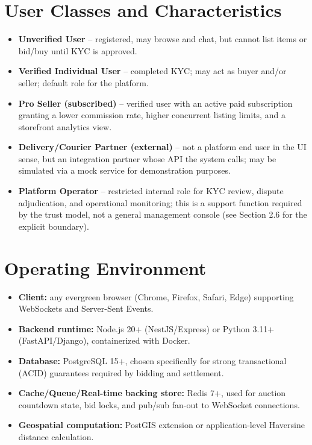 \documentclass[11pt,a4paper]{report}
\begin{document}
\section{User Classes and Characteristics}
\begin{itemize}[nosep]
    \item \textbf{Unverified User} -- registered, may browse and chat, but cannot list items or bid/buy until KYC is approved.
    \item \textbf{Verified Individual User} -- completed KYC; may act as buyer and/or seller; default role for the platform.
    \item \textbf{Pro Seller (subscribed)} -- verified user with an active paid subscription granting a lower commission rate, higher concurrent listing limits, and a storefront analytics view.
    \item \textbf{Delivery/Courier Partner (external)} -- not a platform end user in the UI sense, but an integration partner whose API the system calls; may be simulated via a mock service for demonstration purposes.
    \item \textbf{Platform Operator} -- restricted internal role for KYC review, dispute adjudication, and operational monitoring; this is a support function required by the trust model, not a general management console (see Section 2.6 for the explicit boundary).
\end{itemize}

\section{Operating Environment}
\begin{itemize}[nosep]
    \item \textbf{Client:} any evergreen browser (Chrome, Firefox, Safari, Edge) supporting WebSockets and Server-Sent Events.
    \item \textbf{Backend runtime:} Node.js 20+ (NestJS/Express) or Python 3.11+ (FastAPI/Django), containerized with Docker.
    \item \textbf{Database:} PostgreSQL 15+, chosen specifically for strong transactional (ACID) guarantees required by bidding and settlement.
    \item \textbf{Cache/Queue/Real-time backing store:} Redis 7+, used for auction countdown state, bid locks, and pub/sub fan-out to WebSocket connections.
    \item \textbf{Geospatial computation:} PostGIS extension or application-level Haversine distance calculation.
\end{itemize}
\end{document}
